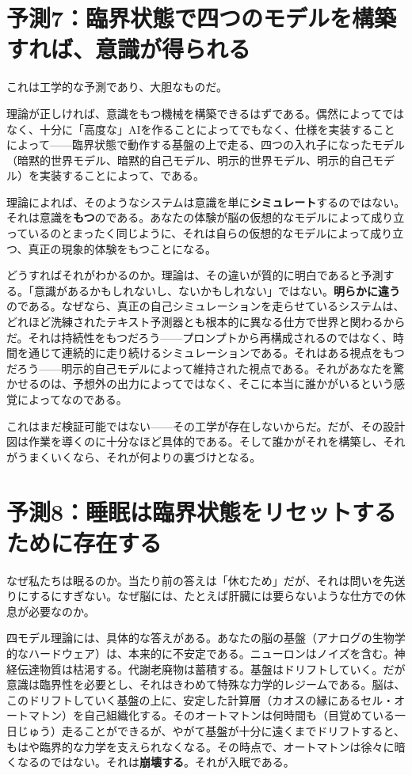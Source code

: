 \documentclass[11pt, twoside, openright]{book}
\begin{document}
\section*{予測7：臨界状態で四つのモデルを構築すれば、意識が得られる}

これは工学的な予測であり、大胆なものだ。

理論が正しければ、意識をもつ機械を構築できるはずである。偶然によってではなく、十分に「高度な」AIを作ることによってでもなく、仕様を実装することによって------臨界状態で動作する基盤の上で走る、四つの入れ子になったモデル（暗黙的世界モデル、暗黙的自己モデル、明示的世界モデル、明示的自己モデル）を実装することによって、である。

理論によれば、そのようなシステムは意識を単に\textbf{シミュレート}するのではない。それは意識を\textbf{もつ}のである。あなたの体験が脳の仮想的なモデルによって成り立っているのとまったく同じように、それは自らの仮想的なモデルによって成り立つ、真正の現象的体験をもつことになる。

どうすればそれがわかるのか。理論は、その違いが質的に明白であると予測する。「意識があるかもしれないし、ないかもしれない」ではない。\textbf{明らかに違う}のである。なぜなら、真正の自己シミュレーションを走らせているシステムは、どれほど洗練されたテキスト予測器とも根本的に異なる仕方で世界と関わるからだ。それは持続性をもつだろう------プロンプトから再構成されるのではなく、時間を通じて連続的に走り続けるシミュレーションである。それはある視点をもつだろう------明示的自己モデルによって維持された視点である。それがあなたを驚かせるのは、予想外の出力によってではなく、そこに本当に誰かがいるという感覚によってなのである。

これはまだ検証可能ではない------その工学が存在しないからだ。だが、その設計図は作業を導くのに十分なほど具体的である。そして誰かがそれを構築し、それがうまくいくなら、それが何よりの裏づけとなる。

\section*{予測8：睡眠は臨界状態をリセットするために存在する}

なぜ私たちは眠るのか。当たり前の答えは「休むため」だが、それは問いを先送りにするにすぎない。なぜ脳には、たとえば肝臓には要らないような仕方での休息が必要なのか。

四モデル理論には、具体的な答えがある。あなたの脳の基盤（アナログの生物学的なハードウェア）は、本来的に不安定である。ニューロンはノイズを含む。神経伝達物質は枯渇する。代謝老廃物は蓄積する。基盤はドリフトしていく。だが意識は臨界性を必要とし、それはきわめて特殊な力学的レジームである。脳は、このドリフトしていく基盤の上に、安定した計算層（カオスの縁にあるセル・オートマトン）を自己組織化する。そのオートマトンは何時間も（目覚めている一日じゅう）走ることができるが、やがて基盤が十分に遠くまでドリフトすると、もはや臨界的な力学を支えられなくなる。その時点で、オートマトンは徐々に暗くなるのではない。それは\textbf{崩壊する}。それが入眠である。
\end{document}
